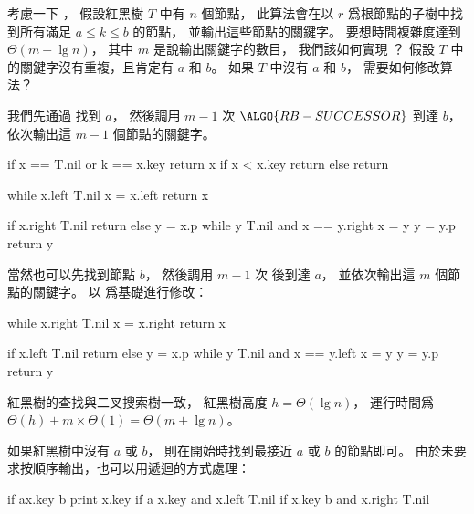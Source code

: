 \startEXERCISE\DIFFICULT
考慮一下 ，
假設紅黑樹 $T$ 中有 $n$ 個節點，
此算法會在以 $r$ 爲根節點的子樹中找到所有滿足 $a\le k\le b$ 的節點，
並輸出這些節點的關鍵字。
要想時間複雜度達到 $\Theta(m+\lg n)$，
其中 $m$ 是說輸出關鍵字的數目，
我們該如何實現 ？
假設 $T$ 中的關鍵字沒有重複，且肯定有 $a$ 和 $b$。
如果 $T$ 中沒有 $a$ 和 $b$，
需要如何修改算法？
\stopEXERCISE

\startANSWER
我們先通過  找到 $a$，
然後調用 $m-1$ 次 $\ALGO{RB-SUCCESSOR}$ 到達 $b$，
依次輸出這 $m-1$ 個節點的關鍵字。

\startCLRSCODE
if x == T.nil or k == x.key
	return x
if x < x.key
	return 
else
	return 
\stopCLRSCODE

\startCLRSCODE
while x.left \ne T.nil
	x = x.left
return x
\stopCLRSCODE

\startCLRSCODE
if x.right \ne T.nil
	return 
else
	y = x.p
	while y \ne T.nil and x == y.right
		x = y
		y = y.p
	return y
\stopCLRSCODE

當然也可以先找到節點 $b$，
然後調用 $m-1$ 次  後到達 $a$，
並依次輸出這 $m$ 個節點的關鍵字。
以  爲基礎進行修改：

\startCLRSCODE
while x.right \ne T.nil
	x = x.right
return x
\stopCLRSCODE

\startCLRSCODE
if x.left \ne T.nil
	return 
else
	y = x.p
	while y \ne T.nil and x == y.left
		x = y
		y = y.p
	return y
\stopCLRSCODE

紅黑樹的查找與二叉搜索樹一致，
紅黑樹高度 $h=\Theta(\lg n)$，
運行時間爲 $\Theta(h) + m \times \Theta(1) = \Theta(m + \lg n)$。

如果紅黑樹中沒有 $a$ 或 $b$，
則在開始時找到最接近 $a$ 或 $b$ 的節點即可。
由於未要求按順序輸出，也可以用遞迴的方式處理：

\startCLRSCODE
if a\le x.key \le b
	print x.key
if a \le x.key and x.left \ne T.nil
if x.key \le b and x.right \ne T.nil
\stopCLRSCODE
\stopANSWER
